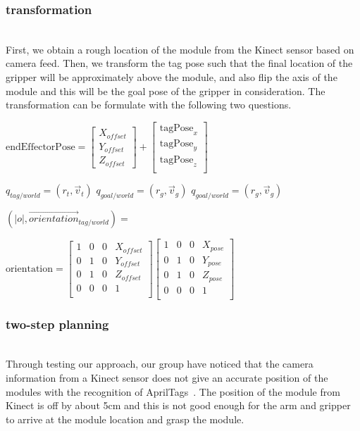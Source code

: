 \subsubsection {transformation}~\\
First, we obtain a rough location of the module from the Kinect sensor based on camera feed. Then, we transform the tag pose such that the final location of the gripper will be approximately above the module,  and also flip the axis of the module and this will be the goal pose of the gripper in consideration. The transformation can be formulate with the following two questions.

$\mathrm{endEffectorPose}=
\begin{bmatrix}
    X_{offset} \\
    Y_{offset} \\
    Z_{offset}
\end{bmatrix}
+
\begin{bmatrix}
    \mathrm{tagPose}_{x} \\
    \mathrm{tagPose}_{y} \\
    \mathrm{tagPose}_{z} \\
\end{bmatrix}
$

$q_{tag/world} = (r_t,\overrightarrow{v}_t)$
$q_{goal/world} = (r_g,\overrightarrow{v}_g)$
$q_{goal/world} = (r_g,\overrightarrow{v}_g)$

$(|o|,\overrightarrow{orientation}_{tag/world}) = $

$\mathrm{orientation}=
\begin{bmatrix}
    1 & 0 & 0 & X_{offset} \\
    0 & 1 & 0 & Y_{offset} \\
    0 & 1 & 0 & Z_{offset} \\
    0 & 0 & 0 & 1 \\
\end{bmatrix}
\begin{bmatrix}
    1 & 0 & 0 & X_{pose} \\
    0 & 1 & 0 & Y_{pose} \\
    0 & 1 & 0 & Z_{pose} \\
    0 & 0 & 0 & 1 \\
\end{bmatrix}
$


\subsubsection {two-step planning}~\\
Through testing our approach, our group have noticed that the camera information from a Kinect sensor does not give an accurate position of the modules with the recognition of AprilTags~\cite{Olson11}. The position of the module from Kinect is off by about 5cm and this is not good enough for the arm and gripper to arrive at the module location and grasp the module.
 
